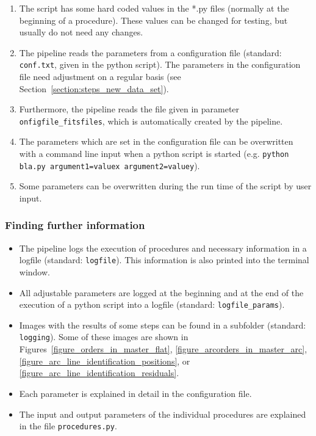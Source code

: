 \documentclass[10pt,a4paper]{article}
\begin{document}
\begin{enumerate}
  \item The script has some hard coded values in the *.py files (normally at the beginning of a procedure). These values can be changed for testing, but usually do not need any changes.
  \item The pipeline reads the parameters from a configuration file (standard: \verb|conf.txt|, given in the python script). The parameters in the configuration file need adjustment on a regular basis (see Section~\ref{section:steps_new_data_set}).
  \item Furthermore, the pipeline reads the file given in parameter \verb|onfigfile_fitsfiles|, which is automatically created by the pipeline.
  \item The parameters which are set in the configuration file can be overwritten with a command line input when a python script is started (e.g. \verb|python bla.py argument1=valuex argument2=valuey|).
  \item Some parameters can be overwritten during the run time of the script by user input.
\end{enumerate}

\subsubsection*{Finding further information}

\begin{itemize}
  \item The pipeline logs the execution of procedures and necessary information in a logfile (standard: \verb|logfile|). This information is also printed into the terminal window.
  \item All adjustable parameters are logged at the beginning and at the end of the execution of a python script into a logfile (standard: \verb|logfile_params|).
  \item Images with the results of some steps can be found in a subfolder (standard: \verb|logging|). Some of these images are shown in Figures~\ref{figure_orders_in_master_flat}, \ref{figure_arcorders_in_master_arc}, \ref{figure_arc_line_identification_positions}, or \ref{figure_arc_line_identification_residuals}.
  \item Each parameter is explained in detail in the configuration file.
  \item The input and output parameters of the individual procedures are explained in the file \verb|procedures.py|.
\end{itemize}
\end{document}
